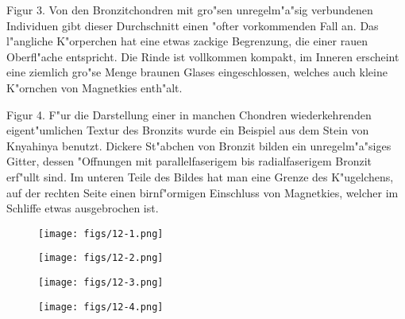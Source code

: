 \documentclass[a4paper, 11pt, oneside, polutonikogreek, german]{article}
\begin{document}
Figur 3. Von den Bronzitchondren mit gro"sen unregelm"a"sig verbundenen Individuen gibt dieser Durchschnitt einen "ofter vorkommenden Fall an. Das l"angliche K"orperchen hat eine etwas zackige Begrenzung, die einer rauen Oberfl"ache entspricht. Die Rinde ist vollkommen kompakt, im Inneren erscheint eine ziemlich gro"se Menge braunen Glases eingeschlossen, welches auch kleine K"ornchen von Magnetkies enth"alt.

Figur 4. F"ur die Darstellung einer in manchen Chondren wiederkehrenden eigent"umlichen Textur des Bronzits wurde ein Beispiel aus dem Stein von Knyahinya benutzt. Dickere St"abchen von Bronzit bilden ein unregelm"a"siges Gitter, dessen "Offnungen mit parallelfaserigem bis radialfaserigem Bronzit erf"ullt sind. Im unteren Teile des Bildes hat man eine Grenze des K"ugelchens, auf der rechten Seite einen birnf"ormigen Einschluss von Magnetkies, welcher im Schliffe etwas ausgebrochen ist.
\clearpage

\vspace*{\fill}
\begin{figure}[H]
\centering
\texttt{[image: figs/12-1.png]}
\caption{}
\end{figure}
\vspace*{\fill}
\clearpage

\vspace*{\fill}
\begin{figure}[H]
\centering
\texttt{[image: figs/12-2.png]}
\caption{}
\end{figure}
\vspace*{\fill}
\clearpage

\vspace*{\fill}
\begin{figure}[H]
\centering
\texttt{[image: figs/12-3.png]}
\caption{}
\end{figure}
\vspace*{\fill}
\clearpage

\vspace*{\fill}
\begin{figure}[H]
\centering
\texttt{[image: figs/12-4.png]}
\caption{}
\end{figure}
\vspace*{\fill}
\clearpage
\end{document}
